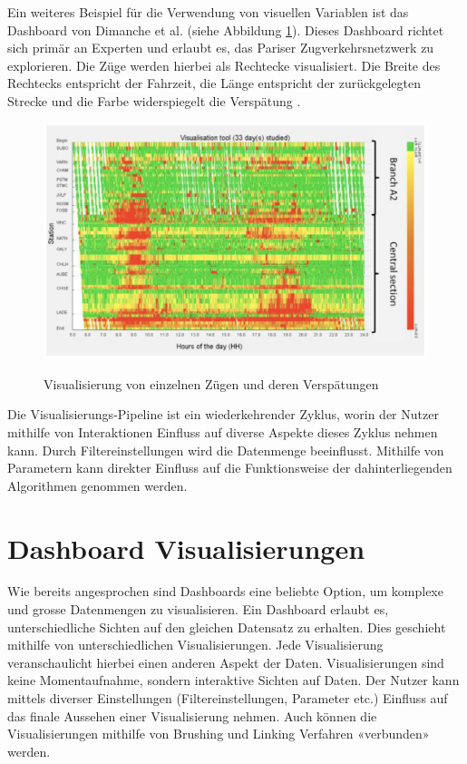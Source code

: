 Ein weiteres Beispiel für die Verwendung von visuellen Variablen ist das Dashboard von Dimanche et al. (siehe Abbildung \ref{fig_massive_railway_visualization}). Dieses Dashboard richtet sich primär an Experten und erlaubt es, das Pariser Zugverkehrsnetzwerk zu explorieren. Die Züge werden hierbei als Rechtecke visualisiert. Die Breite des Rechtecks entspricht der Fahrzeit, die Länge entspricht der zurückgelegten Strecke und die Farbe widerspiegelt die Verspätung \parencite{visualization_tool_operating_experts_2017}.

\begin{figure}[H]
    \caption{Visualisierung von einzelnen Zügen und deren Verspätungen \parencite[S. 15843]{visualization_tool_operating_experts_2017}}
    \includegraphics[width=.5\linewidth]{content/00_assets/massive_railway_visualization.png}
    \label{fig_massive_railway_visualization}
\end{figure}

Die Visualisierungs-Pipeline ist ein wiederkehrender Zyklus, worin der Nutzer mithilfe von Interaktionen Einfluss auf diverse Aspekte dieses Zyklus nehmen kann. Durch Filtereinstellungen wird die Datenmenge beeinflusst. Mithilfe von Parametern kann direkter Einfluss auf die Funktionsweise der dahinterliegenden Algorithmen genommen werden\parencite[S.2971]{survey_traffic_data_visualization_2015}.

\section{Dashboard Visualisierungen}
Wie bereits angesprochen sind Dashboards eine beliebte Option, um komplexe und grosse Datenmengen zu visualisieren. Ein Dashboard erlaubt es, unterschiedliche Sichten auf den gleichen Datensatz zu erhalten. Dies geschieht mithilfe von unterschiedlichen Visualisierungen. Jede Visualisierung veranschaulicht hierbei einen anderen Aspekt der Daten. Visualisierungen sind keine Momentaufnahme, sondern interaktive Sichten auf Daten. Der Nutzer kann mittels diverser Einstellungen (Filtereinstellungen, Parameter etc.) Einfluss auf das finale Aussehen einer Visualisierung nehmen. Auch können die Visualisierungen mithilfe von Brushing und Linking Verfahren «verbunden» werden. 

